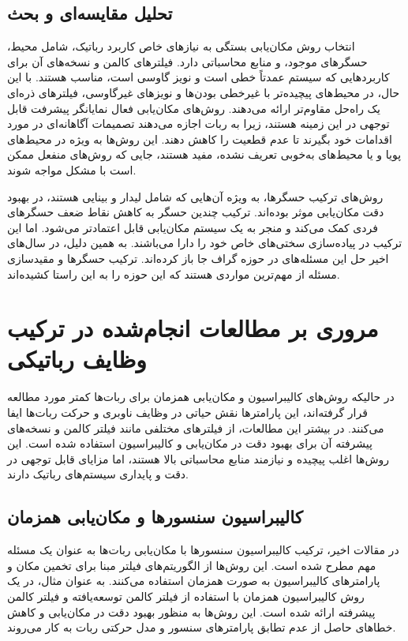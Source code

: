 \subsection{تحلیل مقایسه‌ای و بحث}

انتخاب روش مکان‌یابی بستگی به نیازهای خاص کاربرد رباتیک، شامل محیط، حسگرهای موجود، و منابع محاسباتی دارد. فیلترهای کالمن و نسخه‌های آن برای کاربردهایی که سیستم عمدتاً خطی است و نویز گاوسی است، مناسب هستند. با این حال، در محیط‌های پیچیده‌تر با غیرخطی بودن‌ها و نویزهای غیرگاوسی، فیلترهای ذره‌ای یک راه‌حل مقاوم‌تر ارائه می‌دهند. روش‌های مکان‌یابی فعال نمایانگر پیشرفت قابل توجهی در این زمینه هستند، زیرا به ربات اجازه می‌دهند تصمیمات آگاهانه‌ای در مورد اقدامات خود بگیرند تا عدم قطعیت را کاهش دهند. این روش‌ها به ویژه در محیط‌های پویا و یا محیط‌های به‌خوبی تعریف نشده، مفید هستند، جایی که روش‌های منفعل ممکن است با مشکل مواجه شوند.

روش‌های ترکیب حسگرها، به ویژه آن‌هایی که شامل لیدار و بینایی هستند، در بهبود دقت مکان‌یابی موثر بوده‌اند. ترکیب چندین حسگر به کاهش نقاط ضعف حسگرهای فردی کمک می‌کند و منجر به یک سیستم مکان‌یابی قابل اعتمادتر می‌شود. اما این ترکیب در پیاده‌سازی سختی‌های خاص خود را دارا می‌باشند. به همین دلیل، در سال‌های اخیر حل این مسئله‌های در حوزه گراف جا باز کرده‌اند. ترکیب حسگر‌ها و مقید‌سازی مسئله از مهم‌ترین مواردی هستند که این حوزه ‌را به این راستا کشیده‌اند.

\section{مروری بر مطالعات انجام‌شده در ترکیب وظایف رباتیکی} 


در‌ حالیکه روش‌های کالیبراسیون و مکان‌یابی همزمان برای ربات‌ها کمتر مورد مطالعه قرار گرفته‌اند، این پارامترها نقش حیاتی در وظایف ناوبری و حرکت ربات‌ها ایفا می‌کنند. در بیشتر این مطالعات، از فیلترهای مختلفی مانند فیلتر کالمن و نسخه‌های پیشرفته آن برای بهبود دقت در مکان‌یابی و کالیبراسیون استفاده شده است. این روش‌ها اغلب پیچیده و نیازمند منابع محاسباتی بالا هستند، اما مزایای قابل توجهی در دقت و پایداری سیستم‌های رباتیک دارند.

\subsection{کالیبراسیون سنسورها و مکان‌یابی همزمان}
در مقالات اخیر، ترکیب کالیبراسیون سنسورها با مکان‌یابی ربات‌ها به عنوان یک مسئله مهم مطرح شده است. این روش‌ها از الگوریتم‌های فیلتر مبنا برای تخمین مکان و پارامترهای کالیبراسیون به صورت همزمان استفاده می‌کنند. به عنوان مثال، در \cite{kummerle2012simultaneous} یک روش کالیبراسیون همزمان با استفاده از فیلتر کالمن توسعه‌یافته و فیلتر کالمن پیشرفته ارائه شده است. این روش‌ها به منظور بهبود دقت در مکان‌یابی و کاهش خطاهای حاصل از عدم تطابق پارامترهای سنسور و مدل حرکتی ربات به کار می‌روند. 

